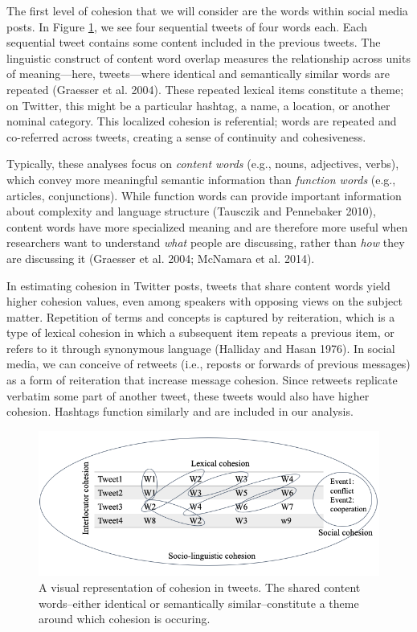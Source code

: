 \documentclass[english,man]{apa6}
\begin{document}
The first level of cohesion that we will consider are the words within social
media posts. In Figure \ref{fig:cohesion-in-tweets}, we see four sequential
tweets of four words each. Each sequential tweet contains some content
included in the previous tweets. The linguistic construct of content word
overlap measures the relationship across units of meaning---here, tweets---where
identical and semantically similar words are repeated (Graesser et al. 2004). These
repeated lexical items constitute a theme; on Twitter, this might be a
particular hashtag, a name, a location, or another nominal category. This
localized cohesion is referential; words are repeated and co-referred across
tweets, creating a sense of continuity and cohesiveness.

Typically, these analyses focus on \emph{content words} (e.g., nouns, adjectives,
verbs), which convey more meaningful semantic information than \emph{function words}
(e.g., articles, conjunctions). While function words can provide important
information about complexity and language structure
(Tausczik and Pennebaker 2010), content words have more specialized meaning and
are therefore more useful when researchers want to understand \emph{what} people are
discussing, rather than \emph{how} they are discussing it (Graesser et al. 2004; McNamara et al. 2014).

In estimating cohesion in Twitter posts, tweets that share content words
yield higher cohesion values, even among speakers with opposing
views on the subject matter. Repetition of terms and concepts is captured by
reiteration, which is a type of lexical cohesion in which a subsequent item
repeats a previous item, or refers to it through synonymous language
(Halliday and Hasan 1976). In social media, we can conceive of retweets (i.e., reposts
or forwards of previous messages) as a form of reiteration
that increase message cohesion. Since retweets replicate verbatim some part of
another tweet, these tweets would also have higher cohesion. Hashtags function
similarly and are included in our analysis.

\begin{figure}
\includegraphics[width=1\linewidth]{./figs/cohesion-in-tweets} \caption{A visual representation of cohesion in tweets. The shared content words--either identical or semantically similar--constitute a theme around which cohesion is occuring.}\label{fig:cohesion-in-tweets}
\end{figure}
\end{document}
